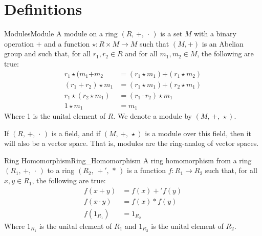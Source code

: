 \section{Definitions}
    \begin{fdefinition}{Modules}{Module}
        A module on a ring $(R,\,+,\,\cdot\,)$ is a set $M$ with a binary
        operation $\boldsymbol{+}$ and a function
        $\star:R\times{M}\rightarrow{M}$ such that $(M,\boldsymbol{+})$ is an
        Abelian group and such that, for all $r_{1},r_{2}\in{R}$ and for all
        $m_{1},m_{2}\in{M}$, the following are true:
        \begin{align}
            r_{1}\star(m_{1}\boldsymbol{+}m_{2}
            &=(r_{1}\star{m}_{1})\boldsymbol{+}(r_{1}\star{m}_{2})
            \tag{Scalar Distributivity}\\
            (r_{1}+r_{2})\star{m}_{1}
            &=(r_{1}\star{m}_{1})\boldsymbol{+}(r_{2}\star{m}_{1})
            \tag{Module Distributivity}\\
            r_{1}\star(r_{2}\star{m}_{1})
            &=(r_{1}\cdot{r}_{2})\star{m}_{1}
            \tag{Associativity}\\
            1\star{m}_{1}&=m_{1}
            \tag{Identity}
        \end{align}
        Where 1 is the unital element of $R$. We denote a module by
        $(M,\,\boldsymbol{+},\,\star)$.
    \end{fdefinition}
    If $(R,\,+,\,\cdot\,)$ is a field, and if $(M,\,\boldsymbol{+},\,\star)$
    is a module over this field, then it will also be a vector space. That
    is, modules are the ring-analog of vector spaces.
    \begin{fdefinition}{Ring Homomorphism}{Ring_Homomorphism}
        A \gls{ring homomorphism} from a \gls{ring} $(R_{1},\,+,\,\cdot\,)$
        to a ring $(R_{2},\,+',\,*\,)$ is a \gls{function}
        $f:R_{1}\rightarrow{R}_{2}$ such that, for all $x,y\in{R}_{1}$, the
        following are true:
        \begin{align}
            f(x+y)&=f(x)+'f(y)
            \tag{Preservation of Addition}\\
            f(x\cdot{y})&=f(x)*f(y)
            \tag{Preservation of Multiplication}\\
            f(1_{R_{1}})&=1_{R_{2}}
            \tag{Preservation of Identities}
        \end{align}
        Where $1_{R_{1}}$ is the unital element of $R_{1}$ and
        $1_{R_{2}}$ is the unital element of $R_{2}$.
    \end{fdefinition}
